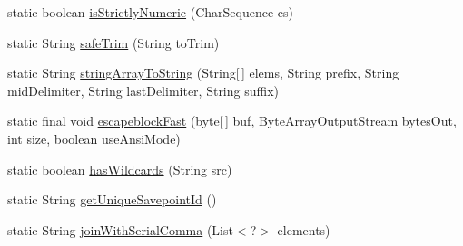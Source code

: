 \begin{DoxyCompactItemize}
\item 
static boolean \mbox{\hyperlink{classcom_1_1mysql_1_1cj_1_1util_1_1_string_utils_acf95de676373ca2fd9f2ef4ea9cf20bd}{is\+Strictly\+Numeric}} (Char\+Sequence cs)
\item 
static String \mbox{\hyperlink{classcom_1_1mysql_1_1cj_1_1util_1_1_string_utils_a5396da0d2136d1d4c29ac524fb3c4a95}{safe\+Trim}} (String to\+Trim)
\item 
static String \mbox{\hyperlink{classcom_1_1mysql_1_1cj_1_1util_1_1_string_utils_affd9db31d705e4eb839d18f08564459a}{string\+Array\+To\+String}} (String\mbox{[}$\,$\mbox{]} elems, String prefix, String mid\+Delimiter, String last\+Delimiter, String suffix)
\item 
static final void \mbox{\hyperlink{classcom_1_1mysql_1_1cj_1_1util_1_1_string_utils_ad76be718917db8d91c0f77e545fb4651}{escapeblock\+Fast}} (byte\mbox{[}$\,$\mbox{]} buf, Byte\+Array\+Output\+Stream bytes\+Out, int size, boolean use\+Ansi\+Mode)
\item 
static boolean \mbox{\hyperlink{classcom_1_1mysql_1_1cj_1_1util_1_1_string_utils_a204a2c01c54e82d727be35f18bfeaffe}{has\+Wildcards}} (String src)
\item 
static String \mbox{\hyperlink{classcom_1_1mysql_1_1cj_1_1util_1_1_string_utils_ab44e0f6cf8aa3f48cd7a0ea0ed9ced2d}{get\+Unique\+Savepoint\+Id}} ()
\item 
static String \mbox{\hyperlink{classcom_1_1mysql_1_1cj_1_1util_1_1_string_utils_afa316f29440d108b71338a160eeb4868}{join\+With\+Serial\+Comma}} (List$<$?$>$ elements)
\end{DoxyCompactItemize}
